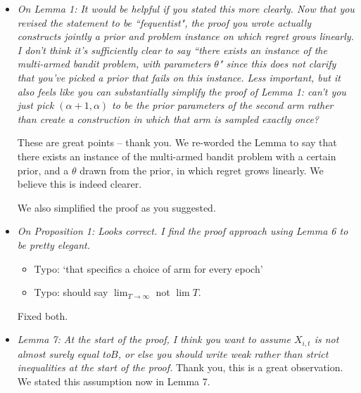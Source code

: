 \documentclass[11pt]{article}
\newcommand{\1}{\ensuremath{\mathbf{1}}} %
\theoremstyle{thm-sf}
\begin{document}
	\begin{itemize}
		\item {\it On Lemma 1: It would be helpful if you stated this more clearly. Now that you revised the statement to be ``fequentist", the proof you wrote actually constructs jointly a prior and problem instance on which regret grows linearly. I don't think it's sufficiently clear to say ``there exists an instance of the multi-armed bandit problem, with parameters $\theta$" since this does not clarify that you’ve picked a prior that fails on this instance. Less important, but it also feels like you can substantially simplify the proof of Lemma 1: can’t you just pick $(\alpha + 1, \alpha)$ to be the prior parameters of the second arm rather than create a construction in which that arm is sampled exactly once?
		}
		
		These are great points -- thank you. We re-worded the Lemma to say that there exists an instance of the multi-armed bandit problem with a certain prior, and a $\theta$ drawn from the prior, in which regret grows linearly. We believe this is indeed clearer.
		
		We also simplified the proof as you suggested.
		
		\item {\it On Proposition 1: Looks correct. I find the proof approach using Lemma 6 to be pretty elegant.
			\begin{itemize}
				\item Typo: `that specifics a choice of arm for every epoch'
				\item  Typo: should say $\lim_{T\to\infty}$ not $\lim T$.
			\end{itemize}
		}
	
		Fixed both.
	
		\item {\it Lemma 7: At the start of the proof, I think you want to assume $X_{i,t}$ is not almost surely equal to$ B$, or else you should write weak rather than strict inequalities at the start of the proof.}
		Thank you, this is a great observation. We stated this assumption now in Lemma 7.
	
	
	


	
	\end{itemize}

	





 
\end{document}
